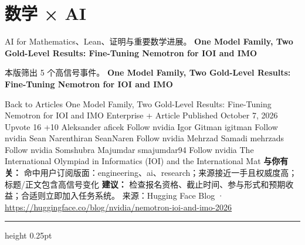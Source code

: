 \documentclass[10.5pt]{ctexart}
\begin{document}
\section*{数学 × AI}
{\color{ormuted} AI for Mathematics、Lean、证明与重要数学进展。}
\vspace{2mm}
{\LARGE\bfseries One Model Family, Two Gold-Level Results: Fine-Tuning Nemotron for IOI and IMO}\par
\vspace{1mm}
{\color{ormuted} 本版筛出 5 个高信号事件。}
\vspace{3mm}
{\Large\bfseries One Model Family, Two Gold-Level Results: Fine-Tuning Nemotron for IOI and IMO}\par
Back to Articles One Model Family, Two Gold-Level Results: Fine-Tuning Nemotron for IOI and IMO Enterprise + Article Published October 7, 2026 Upvote 16 +10 Aleksander aficek Follow nvidia Igor Gitman igitman Follow nvidia Sean Narenthiran SeanNaren Follow nvidia Mehrzad Samadi mehrzads Follow nvidia Somshubra Majumdar smajumdar94 Follow nvidia The International Olympiad in Informatics (IOI) and the International Mat
\textbf{与你有关：} 命中用户订阅版面：engineering、ai、research；来源接近一手且权威度高；标题/正文包含高信号变化
\textbf{建议：} 检查报名资格、截止时间、参与形式和预期收益；合适则立即加入任务系统。
{\footnotesize\color{ormuted} 来源：Hugging Face Blog · \url{https://huggingface.co/blog/nvidia/nemotron-ioi-and-imo-2026}}
\vspace{4mm}
\hrule height 0.25pt
\vspace{3mm}
\end{document}
